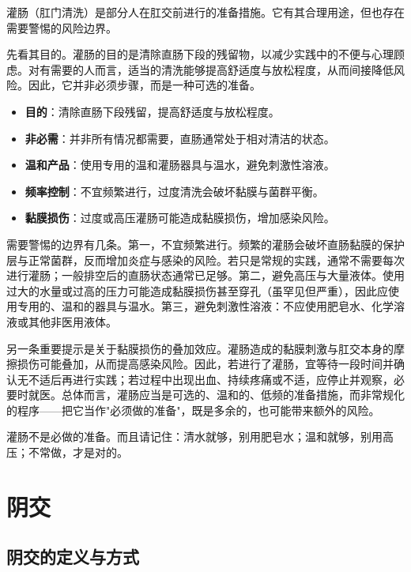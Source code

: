 \documentclass[12pt,UTF8]{ctexbook}
\newcommand{\keyword}[1]{\textbf{#1}}
\begin{document}
灌肠（肛门清洗）是部分人在肛交前进行的准备措施。它有其合理用途，但也存在需要警惕的风险边界。

先看其目的。灌肠的目的是清除直肠下段的残留物，以减少实践中的不便与心理顾虑。对有需要的人而言，适当的清洗能够提高舒适度与放松程度，从而间接降低风险。因此，它并非必须步骤，而是一种可选的准备。

\begin{itemize}
	\item \keyword{目的}：清除直肠下段残留，提高舒适度与放松程度。
	\item \keyword{非必需}：并非所有情况都需要，直肠通常处于相对清洁的状态。
	\item \keyword{温和产品}：使用专用的温和灌肠器具与温水，避免刺激性溶液。
	\item \keyword{频率控制}：不宜频繁进行，过度清洗会破坏黏膜与菌群平衡。
	\item \keyword{黏膜损伤}：过度或高压灌肠可能造成黏膜损伤，增加感染风险。
\end{itemize}

需要警惕的边界有几条。第一，不宜频繁进行。频繁的灌肠会破坏直肠黏膜的保护层与正常菌群，反而增加炎症与感染的风险。若只是常规的实践，通常不需要每次进行灌肠；一般排空后的直肠状态通常已足够。第二，避免高压与大量液体。使用过大的水量或过高的压力可能造成黏膜损伤甚至穿孔（虽罕见但严重），因此应使用专用的、温和的器具与温水。第三，避免刺激性溶液：不应使用肥皂水、化学溶液或其他非医用液体。

另一条重要提示是关于黏膜损伤的叠加效应。灌肠造成的黏膜刺激与肛交本身的摩擦损伤可能叠加，从而提高感染风险。因此，若进行了灌肠，宜等待一段时间并确认无不适后再进行实践；若过程中出现出血、持续疼痛或不适，应停止并观察，必要时就医。总体而言，灌肠应当是可选的、温和的、低频的准备措施，而非常规化的程序——把它当作"必须做的准备"，既是多余的，也可能带来额外的风险。

\begin{tcolorbox}[colback=pink!5!white,colframe=red!50!black,title=贴心小叮咛]
	灌肠不是必做的准备。而且请记住：清水就够，别用肥皂水；温和就够，别用高压；不常做，才是对的。
\end{tcolorbox}

\section{阴交}
\subsection{阴交的定义与方式}
\end{document}
